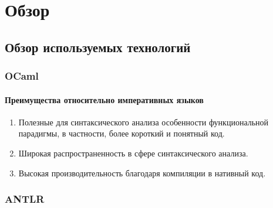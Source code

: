 
\section{Обзор}
\label{sec:relatedworks}

\subsection{Обзор используемых технологий}

\subsubsection{OCaml}

\paragraph {Преимущества относительно императивных языков}

\begin{enumerate}
    \item Полезные для синтаксического анализа особенности функциональной парадигмы, в частности, более короткий и понятный код.
    \item Широкая распространенность в сфере синтаксического анализа.
    \item Высокая производительность благодаря компиляции в нативный код.
\end{enumerate}

\subsubsection{ANTLR}

